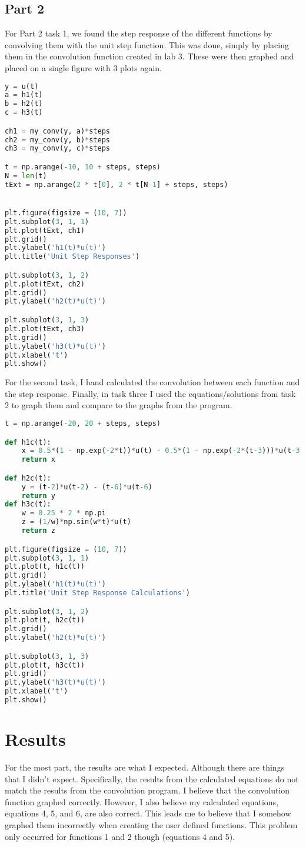 \documentclass[12pt]{report}
\begin{document}
\subsection{Part 2}
For Part 2 task 1, we found the step response of
the different functions by convolving them with the unit
step function. This was done, simply by placing them
in the convolution function created in lab 3.
These were then graphed and placed on a single figure
with 3 plots again.
\begin{lstlisting}[language=Python]
y = u(t)
a = h1(t)
b = h2(t)
c = h3(t)

ch1 = my_conv(y, a)*steps
ch2 = my_conv(y, b)*steps
ch3 = my_conv(y, c)*steps

t = np.arange(-10, 10 + steps, steps)
N = len(t)
tExt = np.arange(2 * t[0], 2 * t[N-1] + steps, steps)


plt.figure(figsize = (10, 7))
plt.subplot(3, 1, 1)
plt.plot(tExt, ch1)
plt.grid()
plt.ylabel('h1(t)*u(t)')
plt.title('Unit Step Responses')

plt.subplot(3, 1, 2)
plt.plot(tExt, ch2)
plt.grid()
plt.ylabel('h2(t)*u(t)')

plt.subplot(3, 1, 3)
plt.plot(tExt, ch3)
plt.grid()
plt.ylabel('h3(t)*u(t)') 
plt.xlabel('t')
plt.show()
\end{lstlisting}
For the second task, I hand calculated the convolution between
each function and the step response. Finally, in task three
I used the equations/solutions from task 2 to graph them and
compare to the graphs from the program.
\begin{lstlisting}[language=Python]
t = np.arange(-20, 20 + steps, steps)

def h1c(t):
    x = 0.5*(1 - np.exp(-2*t))*u(t) - 0.5*(1 - np.exp(-2*(t-3)))*u(t-3)
    return x

def h2c(t):
    y = (t-2)*u(t-2) - (t-6)*u(t-6)
    return y
def h3c(t):
    w = 0.25 * 2 * np.pi
    z = (1/w)*np.sin(w*t)*u(t)
    return z

plt.figure(figsize = (10, 7))
plt.subplot(3, 1, 1)
plt.plot(t, h1c(t))
plt.grid()
plt.ylabel('h1(t)*u(t)')
plt.title('Unit Step Response Calculations')

plt.subplot(3, 1, 2)
plt.plot(t, h2c(t))
plt.grid()
plt.ylabel('h2(t)*u(t)')

plt.subplot(3, 1, 3)
plt.plot(t, h3c(t))
plt.grid()
plt.ylabel('h3(t)*u(t)') 
plt.xlabel('t')
plt.show()
\end{lstlisting}

\section{Results}
For the most part, the results are what I expected. Although
there are things that I didn't expect. Specifically, the
results from the calculated equations do not match the
results from the convolution program. I believe that
the convolution function graphed correctly. However,
I also believe my calculated equations, equations 4, 5, and
6, are also correct. This leads me to believe that I
somehow graphed them incorrectly when creating the user
defined functions. This problem only occurred for 
functions 1 and 2 though (equations 4 and 5).
\end{document}
